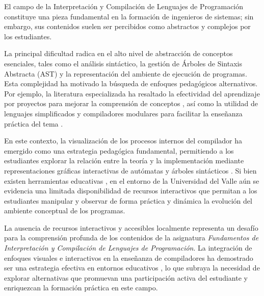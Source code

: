 El campo de la Interpretación y Compilación de Lenguajes de Programación constituye una pieza fundamental en la formación de ingenieros de sistemas; sin embargo, sus contenidos suelen ser percibidos como abstractos y complejos por los estudiantes.

La principal dificultad radica en el alto nivel de abstracción de conceptos esenciales, tales como el análisis sintáctico, la gestión de Árboles de Sintaxis Abstracta (AST) y la representación del ambiente de ejecución de programas. Esta complejidad ha motivado la búsqueda de enfoques pedagógicos alternativos. Por ejemplo, la literatura especializada ha resaltado la efectividad del aprendizaje por proyectos para mejorar la comprensión de conceptos \cite{liu2017evaluation}, así como la utilidad de lenguajes simplificados y compiladores modulares para facilitar la enseñanza práctica del tema \cite{navas2022modular}.

En este contexto, la visualización de los procesos internos del compilador ha emergido como una estrategia pedagógica fundamental, permitiendo a los estudiantes explorar la relación entre la teoría y la implementación mediante representaciones gráficas interactivas de autómatas y árboles sintácticos \cite{delvado2023itt}. Si bien existen herramientas educativas \cite{Stamenković2024AWE}, en el entorno de la Universidad del Valle aún se evidencia una limitada disponibilidad de recursos interactivos que permitan a los estudiantes manipular y observar de forma práctica y dinámica la evolución del ambiente conceptual de los programas.

La ausencia de recursos interactivos y accesibles localmente representa un desafío para la comprensión profunda de los contenidos de la asignatura \textit{Fundamentos de Interpretación y Compilación de Lenguajes de Programación}. La integración de enfoques visuales e interactivos en la enseñanza de compiladores ha demostrado ser una estrategia efectiva en entornos educativos \cite{Stamenković2024AWE}, lo que subraya la necesidad de explorar alternativas que promuevan una participación activa del estudiante y enriquezcan la formación práctica en este campo. 
